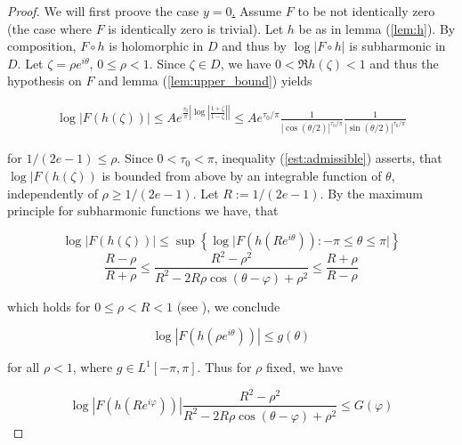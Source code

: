 \begin{proof}
	We will first proove the case \underline{$y = 0$.} Assume $F$ to be not identically zero (the case where $F$ is identically zero is trivial). Let $h$ be as in lemma (\ref{lem:h}). By composition, $F \circ h$ is holomorphic in $D$ and thus by \cite[336]{rudin:rc_analysis:1987} $\log\vert F \circ h \vert$ is subharmonic in $D$. Let $\zeta = \rho e^{i\theta}$, $0 \leqslant \rho < 1$. Since $\zeta \in D$, we have $0 < \Re h(\zeta) < 1$ and thus the hypothesis on $F$ and lemma (\ref{lem:upper_bound}) yields

\begin{gather}
	\log \vert F(h(\zeta)) \vert \leqslant Ae^{\frac{\tau_0}{\pi}\left| \log\left| \frac{1 + \zeta}{1 - \zeta}\right|\right|} \leqslant Ae^{\tau_0/\pi}\frac{1}{\left| \cos(\theta/2) \right|^{\tau_0/\pi}}\frac{1}{\left| \sin(\theta/2) \right|^{\tau_0/\pi}}
	\label{est:admissible}
\end{gather}

	for $1/(2e - 1) \leqslant \rho$. Since $0 < \tau_0 < \pi$, inequality (\ref{est:admissible}) asserts, that $\log \vert F(h(\zeta))$ is bounded from above by an integrable function of $\theta$, independently of $\rho \geqslant 1/(2e - 1)$. Let $R:= 1/(2e - 1)$. By the maximum principle for subharmonic functions we have, that 

	\begin{equation}
		\log \vert F(h(\zeta)) \vert \leqslant \sup\left\{ \log \vert F(h(Re^{i\theta})) : -\pi \leqslant \theta \leqslant \pi\vert \right\}
	\end{equation}
\begin{equation*}
	\frac{R - \rho}{R + \rho} \leqslant \frac{R^2 - \rho^2}{R^2 - 2R\rho\cos(\theta - \varphi) + \rho^2} \leqslant \frac{R + \rho}{R - \rho}
\end{equation*}

which holds for $0 \leqslant \rho < R < 1$ (see \cite[236]{rudin:rc_analysis:1987}), we conclude

\begin{equation*}
	\log\left| F(h(\rho e^{i\theta}))\right| \leqslant g(\theta)
\end{equation*}

for all $\rho < 1$, where $g \in L^1[-\pi,\pi]$. Thus for $\rho$ fixed, we have 

\begin{equation*}
	\log\left| F(h(Re^{i\varphi}))\right| \frac{R^2 - \rho^2}{R^2 - 2R\rho\cos(\theta - \varphi) + \rho^2} \leqslant G(\varphi)
\end{equation*}


\end{proof}
